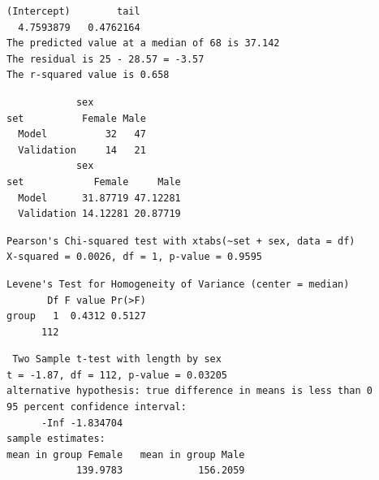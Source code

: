 \documentclass{article}\usepackage[]{graphicx}\usepackage[]{color}
\makeatletter
\newenvironment{kframe}{%
 \def\at@end@of@kframe{}%
 \ifinner\ifhmode%
  \def\at@end@of@kframe{\end{minipage}}%
  \begin{minipage}{\columnwidth}%
 \fi\fi%
 \def\FrameCommand##1{\hskip\@totalleftmargin \hskip-\fboxsep
 \colorbox{shadecolor}{##1}\hskip-\fboxsep
     \hskip-\linewidth \hskip-\@totalleftmargin \hskip\columnwidth}%
 \MakeFramed {\advance\hsize-\width
   \@totalleftmargin\z@ \linewidth\hsize
   \@setminipage}}%
 {\par\unskip\endMakeFramed%
 \at@end@of@kframe}
\newenvironment{knitrout}{}{} %
\makeatother
\begin{document}
\begin{knitrout}
\color{fgcolor}\begin{kframe}
\begin{verbatim}
(Intercept)        tail 
  4.7593879   0.4762164 
The predicted value at a median of 68 is 37.142
The residual is 25 - 28.57 = -3.57
The r-squared value is 0.658
\end{verbatim}
\end{kframe}
\end{knitrout}

\clearpage
\begin{knitrout}
\color{fgcolor}\begin{kframe}
\begin{verbatim}
            sex
set          Female Male
  Model          32   47
  Validation     14   21
            sex
set            Female     Male
  Model      31.87719 47.12281
  Validation 14.12281 20.87719
\end{verbatim}
\end{kframe}
\end{knitrout}
\begin{knitrout}
\color{fgcolor}\begin{kframe}
\begin{verbatim}
Pearson's Chi-squared test with xtabs(~set + sex, data = df) 
X-squared = 0.0026, df = 1, p-value = 0.9595
\end{verbatim}
\end{kframe}
\end{knitrout}
\begin{knitrout}
\color{fgcolor}\begin{kframe}
\begin{verbatim}
Levene's Test for Homogeneity of Variance (center = median)
       Df F value Pr(>F)
group   1  0.4312 0.5127
      112               
\end{verbatim}
\end{kframe}
\end{knitrout}
\begin{knitrout}
\color{fgcolor}\begin{kframe}
\begin{verbatim}
 Two Sample t-test with length by sex 
t = -1.87, df = 112, p-value = 0.03205
alternative hypothesis: true difference in means is less than 0 
95 percent confidence interval:
      -Inf -1.834704 
sample estimates:
mean in group Female   mean in group Male 
            139.9783             156.2059 
\end{verbatim}
\end{kframe}
\end{knitrout}
\end{document}
